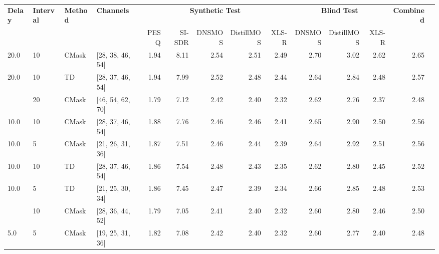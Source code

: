 \begin{tabular}{llllrrrrrrrrrr}
\toprule
\textbf{Delay} & \textbf{Interval} & \textbf{Method} & \textbf{Channels} & \multicolumn{5}{c}{\textbf{Synthetic Test}} & \multicolumn{3}{c}{\textbf{Blind Test}} & \textbf{Combined} \\
 &  &  &  & PESQ & SI-SDR & DNSMOS & DistillMOS & XLS-R & DNSMOS & DistillMOS & XLS-R &  \\
\midrule
20.0 & 10 & CMask & [28, 38, 46, 54] & \cellcolor{green!20}1.94 & \cellcolor{green!20}8.11 & \cellcolor{green!20}2.54 & \cellcolor{green!20}2.51 & \cellcolor{green!20}2.49 & \cellcolor{green!20}2.70 & \cellcolor{green!20}3.02 & \cellcolor{green!20}2.62 & \cellcolor{green!50}2.65 \\
20.0 & 10 & TD & [28, 37, 46, 54] & \cellcolor{green!20}1.94 & \cellcolor{green!20}7.99 & \cellcolor{green!20}2.52 & \cellcolor{green!20}2.48 & \cellcolor{green!20}2.44 & \cellcolor{green!20}2.64 & \cellcolor{green!20}2.84 & \cellcolor{green!20}2.48 & \cellcolor{green!50}2.57 \\
\hdashline
\midrule
10.0 & 20 & CMask & [46, 54, 62, 70] & 1.79 & 7.12 & 2.42 & 2.40 & 2.32 & 2.62 & 2.76 & 2.37 & 2.48 \\
10.0 & 10 & CMask & [28, 37, 46, 54] & \cellcolor{green!20}1.88 & \cellcolor{green!20}7.76 & 2.46 & \cellcolor{green!20}2.46 & \cellcolor{green!20}2.41 & \cellcolor{green!20}2.65 & 2.90 & 2.50 & \cellcolor{green!50}2.56 \\
10.0 & 5 & CMask & [21, 26, 31, 36] & 1.87 & 7.51 & \cellcolor{green!20}2.46 & 2.44 & 2.39 & 2.64 & \cellcolor{green!20}2.92 & \cellcolor{green!20}2.51 & 2.56 \\
10.0 & 10 & TD & [28, 37, 46, 54] & \cellcolor{green!20}1.86 & \cellcolor{green!20}7.54 & \cellcolor{green!20}2.48 & \cellcolor{green!20}2.43 & \cellcolor{green!20}2.35 & 2.62 & 2.80 & 2.45 & 2.52 \\
10.0 & 5 & TD & [21, 25, 30, 34] & 1.86 & 7.45 & 2.47 & 2.39 & 2.34 & \cellcolor{green!20}2.66 & \cellcolor{green!20}2.85 & \cellcolor{green!20}2.48 & \cellcolor{green!50}2.53 \\
\hdashline
\midrule
5.0 & 10 & CMask & [28, 36, 44, 52] & 1.79 & 7.05 & 2.41 & \cellcolor{green!20}2.40 & \cellcolor{green!20}2.32 & 2.60 & \cellcolor{green!20}2.80 & \cellcolor{green!20}2.46 & \cellcolor{green!50}2.50 \\
5.0 & 5 & CMask & [19, 25, 31, 36] & \cellcolor{green!20}1.82 & \cellcolor{green!20}7.08 & \cellcolor{green!20}2.42 & 2.40 & 2.32 & \cellcolor{green!20}2.60 & 2.77 & 2.40 & 2.48 \\

\end{tabular}

